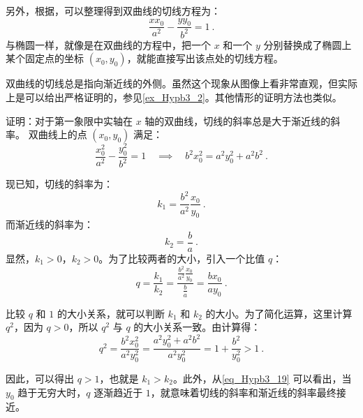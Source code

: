 另外，根据，可以整理得到双曲线的切线方程为：
\begin{equation}
\frac{xx_0}{a^2} - \frac{yy_0}{b^2} = 1~.
\end{equation}
与椭圆一样，就像是在双曲线的方程中，把一个 $x$ 和一个 $y$ 分别替换成了椭圆上某个固定点的坐标 $(x_0, y_0)$，就能直接写出该点处的切线方程。

双曲线的切线总是指向渐近线的外侧。虽然这个现象从图像上看非常直观，但实际上是可以给出严格证明的，参见\autoref{ex_Hypb3_2}。其他情形的证明方法也类似。

\begin{example}{证明：对于第一象限中实轴在 $x$ 轴的双曲线，切线的斜率总是大于渐近线的斜率。}\label{ex_Hypb3_2}
双曲线上的点 $(x_0, y_0)$ 满足：
\begin{equation}
\frac{x_0^2}{a^2} - \frac{y_0^2}{b^2} = 1\quad\implies\quad b^2x_0^2=a^2y_0^2+a^2b^2~.
\end{equation} 

现已知，切线的斜率为：
\begin{equation}
k_1 = \frac{b^2}{a^2}\frac{x_0}{y_0}~.
\end{equation}
而渐近线的斜率为：
\begin{equation}
k_2 = \frac{b}{a}~.
\end{equation}
显然，$k_1 > 0$，$k_2 > 0$。为了比较两者的大小，引入一个比值 $q$：
\begin{equation}
q=\frac{k_1}{k_2}
=\frac{\displaystyle\frac{b^2}{a^2}\frac{x_0}{y_0}}{\displaystyle\frac{b}{a}}
=\frac{bx_0}{ay_0}~.
\end{equation}

比较 $q$ 和 $1$ 的大小关系，就可以判断 $k_1$ 和 $k_2$ 的大小。为了简化运算，这里计算 $q^2$，因为 $q>0$，所以 $q^2$ 与 $q$ 的大小关系一致。由计算得：
\begin{equation}\label{eq_Hypb3_19}
q^2 = \frac{b^2x_0^2}{a^2y_0^2}
= \frac{a^2y_0^2 + a^2b^2}{a^2y_0^2}
= 1 + \frac{b^2}{y_0^2} > 1~.
\end{equation}

因此，可以得出 $q>1$，也就是 $k_1>k_2$。此外，从\autoref{eq_Hypb3_19} 可以看出，当 $y_0$ 趋于无穷大时，$q$ 逐渐趋近于 $1$，就意味着切线的斜率和渐近线的斜率最终接近。
\end{example}